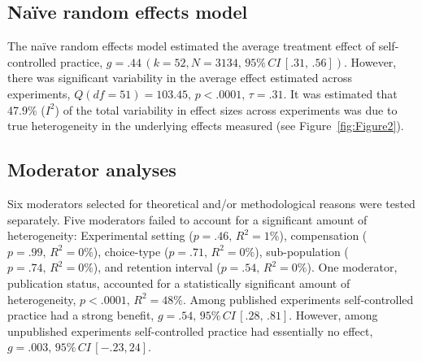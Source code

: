 \documentclass[man,floatsintext,hidelinks]{apa7}
\begin{document}
\subsection{Naïve random effects model}
The naïve random effects model estimated the average treatment effect of self-controlled practice, $g = .44 \,(k = 52, N = 3134, \,95\%\,CI\,[.31, \,.56])$.  However, there was significant variability in the average effect estimated across experiments, $Q(df =  51) =  103.45, \,p < .0001, \,\tau = .31$. It was estimated that 47.9\% ($I^2$) of the total variability in effect sizes across experiments was due to true heterogeneity in the underlying effects measured (see Figure~\ref{fig:Figure2}).

\subsection{Moderator analyses}
Six moderators selected for theoretical and/or methodological reasons were tested separately. Five moderators failed to account for a significant amount of heterogeneity: Experimental setting ($p = .46, \,R^2 = 1\%$), compensation ($p = .99, \,R^2 = 0\%$), choice-type ($p = .71, \,R^2 = 0\%$), sub-population ($p = .74, \,R^2 = 0\%$), and retention interval ($p = .54, \,R^2 = 0\%$). One moderator, publication status, accounted for a statistically significant amount of heterogeneity, $p < .0001, \,R^2 = 48\%$. Among published experiments self-controlled practice had a strong benefit, $g = .54, \,95\%\,CI \,[.28,\,.81]$. However, among unpublished experiments self-controlled practice had essentially no effect, $g = .003, \,95\%\,CI \,[-.23, 24]$.
\end{document}
